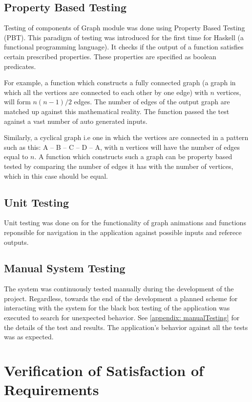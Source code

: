 \subsection{Property Based Testing}
Testing of components of Graph module was done using Property Based Testing (PBT).
This paradigm of testing was introduced for the first time for Haskell (a
functional programming language). It checks if the output of a function
satisfies certain prescribed properties. These properties are specified as
boolean predicates.

For example, a function which constructs a fully connected graph (a graph in
which all the vertices are connected to each other by one edge) with $n$
vertices, will form $n (n - 1) / 2$ edges. The number of edges of the output
graph are matched up against this mathematical reality. The function passed
the test against a vast number of auto generated inputs.

Similarly, a cyclical graph i.e one in which the vertices are connected in a
pattern such as this: A -- B -- C -- D -- A, with n vertices will have the
number of edges equal to $n$. A function which constructs such a graph can be
property based tested by comparing the number of edges it has with the number
of vertices, which in this case should be equal.

\subsection{Unit Testing}
Unit testing was done on for the functionality of graph animations and
functions reponsible for navigation in the application against possible inputs
and referece outputs. 

\subsection{Manual System Testing}
The system was continuously tested manually during the development of the
project. Regardless, towards the end of the development a planned scheme for
interacting with the system for the black box testing of the application was
executed to search for unexpected behavior. See \autoref{appendix:
manualTesting} for the details of the test and results. The application's
behavior against all the tests was as expected.

\section{Verification of Satisfaction of Requirements}

